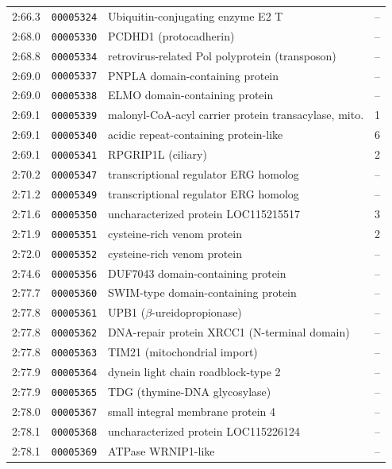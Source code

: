 \begin{longtable}{llp{72mm}c}
    2:66.3 & \texttt{00005324} & Ubiquitin-conjugating enzyme E2 T & -- \\
    2:68.0 & \texttt{00005330} & PCDHD1 (protocadherin) & -- \\
    2:68.8 & \texttt{00005334} & retrovirus-related Pol polyprotein (transposon) & -- \\
    2:69.0 & \texttt{00005337} & PNPLA domain-containing protein & -- \\
    2:69.0 & \texttt{00005338} & ELMO domain-containing protein & -- \\
    2:69.1 & \texttt{00005339} & malonyl-CoA-acyl carrier protein transacylase, mito. & 1 \\
    2:69.1 & \texttt{00005340} & acidic repeat-containing protein-like & 6 \\
    2:69.1 & \texttt{00005341} & RPGRIP1L (ciliary) & 2 \\
    2:70.2 & \texttt{00005347} & transcriptional regulator ERG homolog & -- \\
    2:71.2 & \texttt{00005349} & transcriptional regulator ERG homolog & -- \\
    2:71.6 & \texttt{00005350} & uncharacterized protein LOC115215517 & 3 \\
    2:71.9 & \texttt{00005351} & cysteine-rich venom protein & 2 \\
    2:72.0 & \texttt{00005352} & cysteine-rich venom protein & -- \\
    2:74.6 & \texttt{00005356} & DUF7043 domain-containing protein & -- \\
    2:77.7 & \texttt{00005360} & SWIM-type domain-containing protein & -- \\
    2:77.8 & \texttt{00005361} & UPB1 ($\beta$-ureidopropionase) & -- \\
    2:77.8 & \texttt{00005362} & DNA-repair protein XRCC1 (N-terminal domain) & -- \\
    2:77.8 & \texttt{00005363} & TIM21 (mitochondrial import) & -- \\
    2:77.9 & \texttt{00005364} & dynein light chain roadblock-type 2 & -- \\
    2:77.9 & \texttt{00005365} & TDG (thymine-DNA glycosylase) & -- \\
    2:78.0 & \texttt{00005367} & small integral membrane protein 4 & -- \\
    2:78.1 & \texttt{00005368} & uncharacterized protein LOC115226124 & -- \\
    2:78.1 & \texttt{00005369} & ATPase WRNIP1-like & -- \\

\end{longtable}
